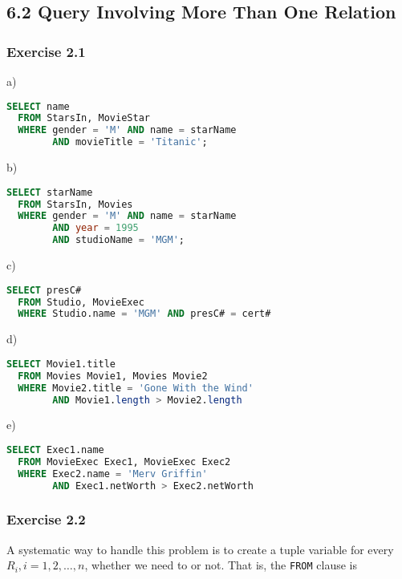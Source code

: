 \documentclass[../../main.tex]{subfiles}
\begin{document}
\subsection*{6.2 Query Involving More Than One Relation}

\subsubsection*{Exercise 2.1}

a)

\begin{lstlisting}[language=sql]
  SELECT name
  FROM StarsIn, MovieStar
  WHERE gender = 'M' AND name = starName
        AND movieTitle = 'Titanic';
\end{lstlisting}

b)

\begin{lstlisting}[language=sql]
  SELECT starName
  FROM StarsIn, Movies
  WHERE gender = 'M' AND name = starName
        AND year = 1995
        AND studioName = 'MGM';
\end{lstlisting}

c)

\begin{lstlisting}[language=sql]
  SELECT presC#
  FROM Studio, MovieExec
  WHERE Studio.name = 'MGM' AND presC# = cert#
\end{lstlisting}

d)

\begin{lstlisting}[language=sql]
  SELECT Movie1.title
  FROM Movies Movie1, Movies Movie2
  WHERE Movie2.title = 'Gone With the Wind'
        AND Movie1.length > Movie2.length
\end{lstlisting}

e)

\begin{lstlisting}[language=sql]
  SELECT Exec1.name
  FROM MovieExec Exec1, MovieExec Exec2
  WHERE Exec2.name = 'Merv Griffin'
        AND Exec1.netWorth > Exec2.netWorth
\end{lstlisting}

\subsubsection*{Exercise 2.2}

A systematic way to handle this problem is to create
a tuple variable for every $R_{i}, i = 1,2,\dots,n$,
whether we need to or not. That is, the \verb|FROM|
clause is
\end{document}
